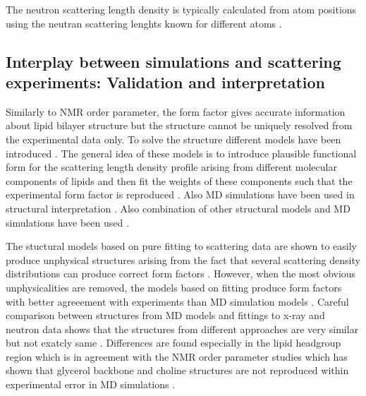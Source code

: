 \documentclass[aps,prl,superscriptaddress,twocolumn]{revtex4}
\begin{document}
The neutron scattering length density is typically calculated from atom positions using the
neutran scattering lenghts known for different atoms \cite{??}.



\subsection{Interplay between simulations and scattering experiments: Validation and interpretation}
Similarly to NMR order parameter, the form factor gives accurate information about lipid
bilayer structure but the structure cannot be uniquely resolved from the experimental data only.
To solve the structure different models have been introduced \cite{??}. The general idea of
these models is to introduce plausible functional form for the scattering length density profile arising
from different molecular components of lipids and then fit the weights of these components such that
the experimental form factor is reproduced \cite{??}. Also MD simulations have been used in structural
interpretation \cite{??}. Also combination of other structural models and MD simulations have been used \cite{??}.

The stuctural models based on pure fitting to scattering data are shown to easily produce unphysical structures
arising from the fact that several scattering density distributions can produce correct form factors \cite{??}.
However, when the most obvious unphysicalities are removed, the models based on fitting produce form factors
with better agreeement with experiments than MD simulation models \cite{??}. Careful comparison
between structures from MD models and fittings to x-ray and neutron data shows that the structures 
from different approaches are very similar but not exatcly same \cite{??}. Differences are found
especially in the lipid headgroup region which is in agreement with the NMR order parameter studies
which has shown that glycerol backbone and choline structures are not reproduced within experimental
error in MD simulations \cite{botan15}.
  
\end{document}
